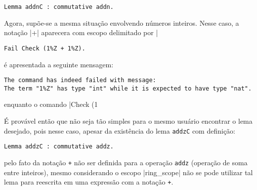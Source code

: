     \begin{lstlisting}[language=coq,frame=single,tabsize=1]
Lemma addnC : commutative addn.
    \end{lstlisting}
Agora, supõe-se a mesma situação envolvendo números inteiros. Nesse caso, a notação \coqinline|+| aparecera com escopo delimitado por \coqinline|%
    \begin{lstlisting}[language=coq,frame=single,tabsize=1]
Fail Check (1%Z + 1%Z).
    \end{lstlisting}
é apresentada a seguinte mensagem:
    \begin{lstlisting}[language=coq-error,frame=single,tabsize=1]
The command has indeed failed with message:
The term "1%Z" has type "int" while it is expected to have type "nat".
    \end{lstlisting}
enquanto o comando \coqinline|Check (1%

É provável então que não seja tão simples para o mesmo usuário encontrar o lema desejado, pois nesse caso, apesar da existência do lema \lstinline[language = coq]!addzC! com definição:
    \begin{lstlisting}[language=coq,frame=single,tabsize=1]
Lemma addzC : commutative addz.
    \end{lstlisting}
pelo fato da notação \lstinline[language = coq]!+! não ser definida para a operação \lstinline[language = coq]!addz! (operação de soma entre inteiros), mesmo considerando o escopo \coqinline|ring_scope| não se pode utilizar tal lema para reescrita em uma expressão com a notação \lstinline[language = coq]!+!.

